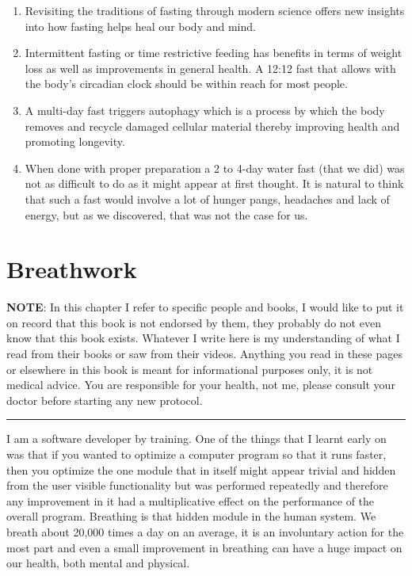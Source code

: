 \documentclass[
  oneside]{book}
\begin{document}
\begin{enumerate}
\def\labelenumi{\arabic{enumi}.}
\item
  Revisiting the traditions of fasting through modern science offers new insights into how fasting helps heal our body and mind.
\item
  Intermittent fasting or time restrictive feeding has benefits in terms of weight loss as well as improvements in general health. A 12:12 fast that allows with the body's circadian clock should be within reach for most people.
\item
  A multi-day fast triggers autophagy which is a process by which the body removes and recycle damaged cellular material thereby improving health and promoting longevity.
\item
  When done with proper preparation a 2 to 4-day water fast (that we did) was not as difficult to do as it might appear at first thought. It is natural to think that such a fast would involve a lot of hunger pangs, headaches and lack of energy, but as we discovered, that was not the case for us.
\end{enumerate}

\hypertarget{breathwork}{%
\chapter{Breathwork}\label{breathwork}}

\textbf{NOTE}: In this chapter I refer to specific people and books, I would like to put it on record that this book is not endorsed by them, they probably do not even know that this book exists. Whatever I write here is my understanding of what I read from their books or saw from their videos. Anything you read in these pages or elsewhere in this book is meant for informational purposes only, it is not medical advice. You are responsible for your health, not me, please consult your doctor before starting any new protocol.

\begin{center}\rule{0.5\linewidth}{0.5pt}\end{center}

I am a software developer by training. One of the things that I learnt early on was that if you wanted to optimize a computer program so that it runs faster, then you optimize the one module that in itself might appear trivial and hidden from the user visible functionality but was performed repeatedly and therefore any improvement in it had a multiplicative effect on the performance of the overall program. Breathing is that hidden module in the human system. We breath about 20,000 times a day on an average, it is an involuntary action for the most part and even a small improvement in breathing can have a huge impact on our health, both mental and physical.
\end{document}

